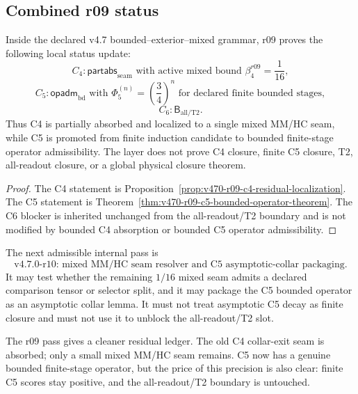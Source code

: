 \subsection{Combined r09 status}
\label{subsec:v470-r09-combined-status}

\begin{theorem}
\label{thm:v470-r09-absorption-admissibility-theorem}
Inside the declared v4.7 bounded--exterior--mixed grammar, r09 proves the
following local status update:
\[
C_4:
\mathsf{partabs}_{\mathrm{seam}}
\text{ with active mixed bound }\beta_4^{r09}=\frac1{16},
\]
\[
C_5:
\mathsf{opadm}_{\mathrm{bd}}
\text{ with }\Phi_5^{(n)}=\left(\frac34\right)^n
\text{ for declared finite bounded stages},
\]
\[
C_6:
\mathsf B_{\mathrm{all/T2}}.
\]
Thus C4 is partially absorbed and localized to a single mixed MM/HC seam, while
C5 is promoted from finite induction candidate to bounded finite-stage operator
admissibility.  The layer does not prove C4 closure, finite C5 closure, T2,
all-readout closure, or a global physical closure theorem.
\end{theorem}

\begin{proof}
The C4 statement is Proposition~\ref{prop:v470-r09-c4-residual-localization}.
The C5 statement is Theorem~\ref{thm:v470-r09-c5-bounded-operator-theorem}.  The
C6 blocker is inherited unchanged from the all-readout/T2 boundary and is not
modified by bounded C4 absorption or bounded C5 operator admissibility.
\end{proof}

\begin{corollary}
\label{cor:v470-r09-permitted-r10-direction}
The next admissible internal pass is
\[
\text{v4.7.0-r10: mixed MM/HC seam resolver and C5 asymptotic-collar packaging.}
\]
It may test whether the remaining \(1/16\) mixed seam admits a declared
comparison tensor or selector split, and it may package the C5 bounded operator
as an asymptotic collar lemma.  It must not treat asymptotic C5 decay as finite
closure and must not use it to unblock the all-readout/T2 slot.
\end{corollary}

\begin{remark}[r09 summary]
The r09 pass gives a cleaner residual ledger.  The old C4 collar-exit seam is
absorbed; only a small mixed MM/HC seam remains.  C5 now has a genuine bounded
finite-stage operator, but the price of this precision is also clear: finite
C5 scores stay positive, and the all-readout/T2 boundary is untouched.
\end{remark}



